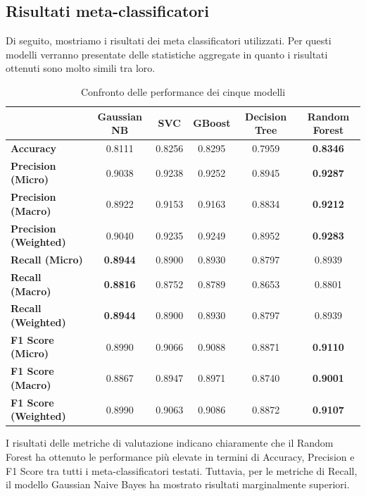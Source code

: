 \documentclass[../../Thesis.tex]{subfiles}
\begin{document}
\subsection{Risultati meta-classificatori}
Di seguito, mostriamo i risultati dei meta classificatori utilizzati. Per questi modelli verranno presentate delle statistiche aggregate in quanto i risultati ottenuti sono molto simili tra loro.\\
\begin{table}[ht]
    \centering
    \begin{tabular}{lccccc}
        \hline
        & \textbf{Gaussian NB} & \textbf{SVC} & \textbf{GBoost} & \textbf{Decision Tree} & \textbf{Random Forest} \\
        \hline
        \textbf{Accuracy} & 0.8111 & 0.8256 & 0.8295 & 0.7959 & \textbf{0.8346} \\
        \textbf{Precision (Micro)} & 0.9038 & 0.9238 & 0.9252 & 0.8945 & \textbf{0.9287} \\
        \textbf{Precision (Macro)} & 0.8922 & 0.9153 & 0.9163 & 0.8834 & \textbf{0.9212} \\
        \textbf{Precision (Weighted)} & 0.9040 & 0.9235 & 0.9249 & 0.8952 & \textbf{0.9283} \\
        \textbf{Recall (Micro)} & \textbf{0.8944} & 0.8900 & 0.8930 & 0.8797 & 0.8939 \\
        \textbf{Recall (Macro)} & \textbf{0.8816} & 0.8752 & 0.8789 & 0.8653 & 0.8801 \\
        \textbf{Recall (Weighted)} & \textbf{0.8944} & 0.8900 & 0.8930 & 0.8797 & 0.8939 \\
        \textbf{F1 Score (Micro)} & 0.8990 & 0.9066 & 0.9088 & 0.8871 & \textbf{0.9110} \\
        \textbf{F1 Score (Macro)} & 0.8867 & 0.8947 & 0.8971 & 0.8740 & \textbf{0.9001} \\
        \textbf{F1 Score (Weighted)} & 0.8990 & 0.9063 & 0.9086 & 0.8872 & \textbf{0.9107} \\
        \hline
    \end{tabular}
    \caption{Confronto delle performance dei cinque modelli}
    \label{tab:comparison}
\end{table}
I risultati delle metriche di valutazione indicano chiaramente che il Random Forest ha ottenuto le performance più elevate in termini di Accuracy, Precision e F1 Score tra tutti i meta-classificatori testati. Tuttavia, per le metriche di Recall, il modello Gaussian Naive Bayes ha mostrato risultati marginalmente superiori.
\end{document}
